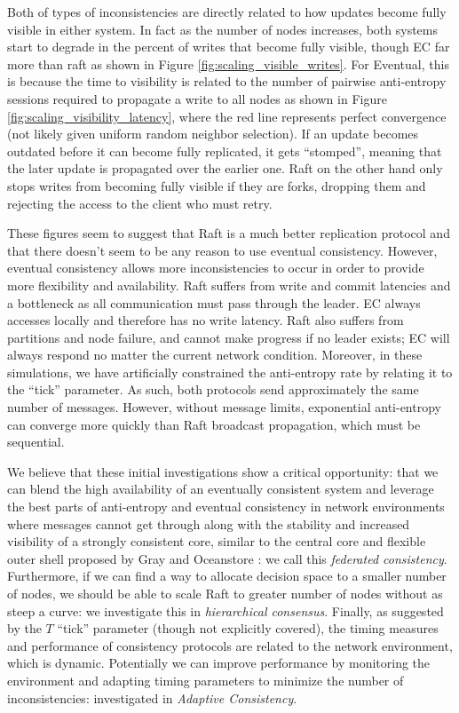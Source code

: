 \documentclass{article}
\begin{document}
Both of types of inconsistencies are directly related to how updates become fully visible in either system. In fact as the number of nodes increases, both systems start to degrade in the percent of writes that become fully visible, though EC far more than raft as shown in Figure \ref{fig:scaling_visible_writes}. For Eventual, this is because the time to visibility is related to the number of pairwise anti-entropy sessions required to propagate a write to all nodes as shown in Figure \ref{fig:scaling_visibility_latency}, where the red line represents perfect convergence (not likely given uniform random neighbor selection). If an update becomes outdated before it can become fully replicated, it gets ``stomped'', meaning that the later update is propagated over the earlier one. Raft on the other hand only stops writes from becoming fully visible if they are forks, dropping them and rejecting the access to the client who must retry.

These figures seem to suggest that Raft is a much better replication protocol and that there doesn't seem to be any reason to use eventual consistency. However, eventual consistency allows more inconsistencies to occur in order to provide more flexibility and availability. Raft suffers from write and commit latencies and a bottleneck as all communication must pass through the leader. EC always accesses locally and therefore has no write latency. Raft also suffers from partitions and node failure, and cannot make progress if no leader exists; EC will always respond no matter the current network condition. Moreover, in these simulations, we have artificially constrained the anti-entropy rate by relating it to the ``tick'' parameter. As such, both protocols send approximately the same number of messages. However, without message limits, exponential anti-entropy can converge more quickly than Raft broadcast propagation, which must be sequential.

We believe that these initial investigations show a critical opportunity: that we can blend the high availability of an eventually consistent system and leverage the best parts of anti-entropy and eventual consistency in network environments where messages cannot get through along with the stability and increased visibility of a strongly consistent core, similar to the central core and flexible outer shell proposed by Gray and Oceanstore \cite{gray_dangers_1996,kubiatowicz_oceanstore:_2000}: we call this \textit{federated consistency}. Furthermore, if we can find a way to allocate decision space to a smaller number of nodes, we should be able to scale Raft to greater number of nodes without as steep a curve: we investigate this in \textit{hierarchical consensus}. Finally, as suggested by the $T$ ``tick'' parameter (though not explicitly covered), the timing measures and performance of consistency protocols are related to the network environment, which is dynamic. Potentially we can improve performance by monitoring the environment and adapting timing parameters to minimize the number of inconsistencies: investigated in \textit{Adaptive Consistency}.
\end{document}
